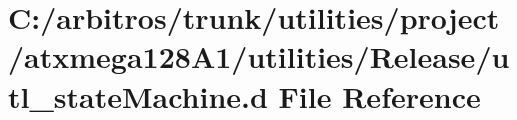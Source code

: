 \hypertarget{utilities_2project_2atxmega128_a1_2utilities_2_release_2utl__state_machine_8d}{\section{C\-:/arbitros/trunk/utilities/project/atxmega128\-A1/utilities/\-Release/utl\-\_\-state\-Machine.d File Reference}
\label{utilities_2project_2atxmega128_a1_2utilities_2_release_2utl__state_machine_8d}
}

